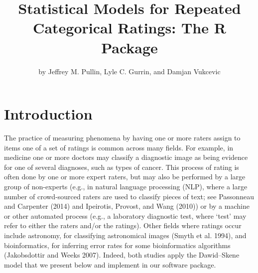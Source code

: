 \title{Statistical Models for Repeated Categorical Ratings: The R Package }


\author{by Jeffrey M. Pullin, Lyle C. Gurrin, and Damjan Vukcevic}

\maketitle


\hypertarget{sec:intro}{%
\section{Introduction}\label{sec:intro}}

The practice of measuring phenomena by having one or more raters assign to items
one of a set of ratings is common across many fields. For example, in medicine
one or more doctors may classify a diagnostic image as being evidence for one of
several diagnoses, such as types of cancer. This process of rating is often done
by one or more expert raters, but may also be performed by a
large group of non-experts (e.g., in natural language processing
(NLP), where a large number of crowd-sourced raters are used to classify
pieces of text; see Passonneau and Carpenter (2014) and Ipeirotis, Provost, and Wang (2010)) or by a machine
or other automated process (e.g., a laboratory diagnostic test, where `test'
may refer to either the raters and/or the ratings). Other fields where ratings
occur include astronomy, for classifying astronomical images (Smyth et al. 1994), and
bioinformatics, for inferring error rates for some bioinformatics algorithms
(Jakobsdottir and Weeks 2007). Indeed, both studies apply the Dawid--Skene model that we
present below and implement in our software package.

